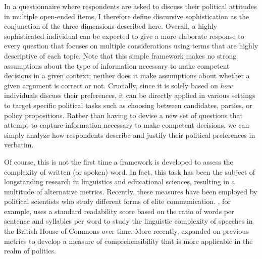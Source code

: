 In a questionnaire where respondents are asked to discuss their political attitudes in multiple open-ended items, I therefore define discursive sophistication as the conjunction of the three dimensions described here. Overall, a highly sophisticated individual can be expected to give a more elaborate response to every question that focuses on multiple considerations using terms that are highly descriptive of each topic. Note that this simple framework makes no strong assumptions about the type of information necessary to make competent decisions in a given context; neither does it make assumptions about whether a given argument is correct or not. Crucially, since it is solely based on \textit{how} individuals discuss their preferences, it can be directly applied in various settings to target specific political tasks such as choosing between candidates, parties, or policy propositions. Rather than having to devise a new set of questions that attempt to capture information necessary to make competent decisions, we can simply analyze how respondents describe and justify their political preferences in verbatim.

Of course, this is not the first time a framework is developed to assess the complexity of written (or spoken) word. In fact, this task has been the subject of longstanding research in linguistics and educational sciences, resulting in a multitude of alternative metrics. Recently, these measures have been employed by political scientists who study different forms of elite communication. \citet{spirling2016democratization}, for example, uses a standard readability score based on the ratio of words per sentence and syllables per word to study the linguistic complexity of speeches in the British House of Commons over time. More recently, \citet{benoit2017measuring} expanded on previous metrics to develop a measure of comprehensibility that is more applicable in the realm of politics.

